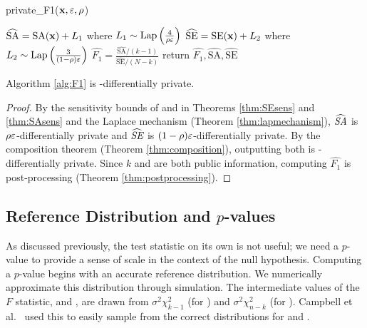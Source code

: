 \begin{algorithm}
    \caption{private\_F1($\mathbf{x},\varepsilon, \rho$) \label{alg:F1}}
    \begin{algorithmic}
        \STATE $\widehat{\text{SA}} = \text{SA}(\mathbf{x}) + L_1$ where $L_1\sim\text{Lap}\left(\frac{4}{\rho\varepsilon}\right)$ 
        \STATE $\widehat{\text{SE}} = \text{SE}(\mathbf{x}) + L_2$ where $L_2\sim\text{Lap}\left(\frac{3}{(1-\rho)\varepsilon}\right)$
        \STATE  $\widehat{F_1} = \frac{\widehat{\text{SA}}/(k-1)}{\widehat{\text{SE}}/(N-k)}$
        \STATE return $\widehat{F_1}, \widehat{\text{SA}}, \widehat{\text{SE}}$
    \end{algorithmic}
\end{algorithm}

\begin{theorem} \label{thm:AlgPriv}
Algorithm \ref{alg:F1} is \eps-differentially private.
\end{theorem}
\begin{proof}
By the sensitivity bounds of \se and \sa in Theorems \ref{thm:SEsens} and \ref{thm:SAsens}  and the Laplace mechanism (Theorem \ref{thm:lapmechanism}), $\widehat{\textit{SA}}$ is $\rho\varepsilon$-differentially private and $\widehat{\textit{SE}}$ is $(1-\rho)\varepsilon$-differentially private. By the composition theorem (Theorem \ref{thm:composition}), outputting both is \eps-differentially private. Since $k$ and \dbsize are both public information, computing $\widehat{F_1}$ is post-processing (Theorem \ref{thm:postprocessing}).
\end{proof}


\subsection{Reference Distribution and $p$-values}
\label{subsec:alg-method}


As discussed previously, the test statistic on its own is not useful; we need a $p$-value to provide a sense of scale in the context of the null hypothesis. Computing a $p$-value begins with an accurate reference distribution.  We numerically approximate this distribution through simulation.  The intermediate values of the $F$ statistic, \ssa and \sse, are drawn from  $\sigma^2\chi_{k-1}^2$ (for \ssa) and $\sigma^2\chi_{n-k}^2$ (for \sse).  Campbell et al.~\cite{campbell2018diffprivanova} used this to easily sample from the correct distributions for \ssa and \sse.

